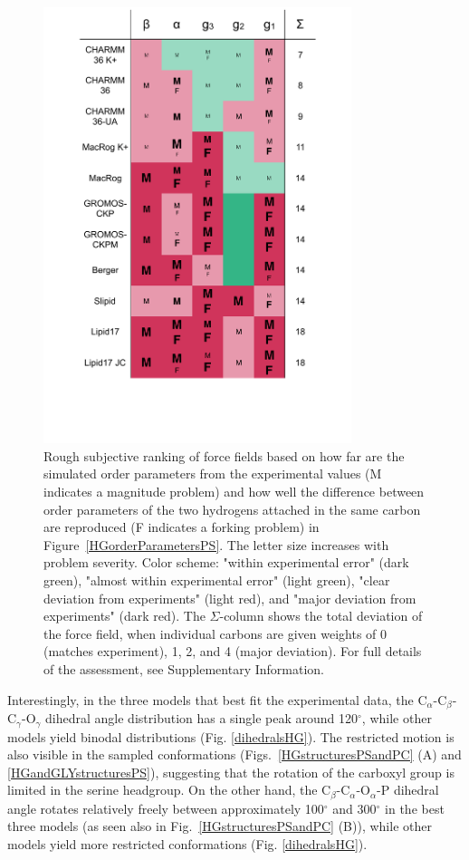 \documentclass[journal=jpcbfk,manuscript=article]{achemso}
\begin{document}
\begin{figure}[]
  \centering
  \includegraphics[width=9.0cm]{../Figs/comparisonTablePS.pdf}
  \caption{\label{comparisonTablePS}
    Rough subjective ranking of force fields based on how far are the simulated order parameters from the experimental
    values ({\textsf{\small M}} indicates a magnitude problem) and how well the difference between order parameters
    of the two hydrogens attached in the same carbon are reproduced ({\textsf{\small F}} indicates a forking problem)
    in Figure~\ref{HGorderParametersPS}.
    The letter size increases with problem severity. Color scheme: "within experimental error" (dark green), "almost within experimental error" (light green), "clear deviation from experiments" (light red), and "major deviation from experiments" (dark red). The $\Sigma$-column shows the total deviation of the force field, when individual carbons are given weights of 0 (matches experiment), 1, 2, and 4 (major deviation). For full details of the assessment, see Supplementary Information.
  }
\end{figure}


Interestingly, in the three models that best fit the experimental data,
the C$_\alpha$-C$_\beta$-C$_\gamma$-O$_\gamma$ dihedral angle distribution has a single peak around 120$^{\circ}$, while
other models yield binodal distributions (Fig. \ref{dihedralsHG}).
The restricted motion is also visible in the sampled conformations (Figs.~\ref{HGstructuresPSandPC} (A) and \ref{HGandGLYstructuresPS}),
suggesting that the rotation of the carboxyl group is limited in the serine headgroup.
On the other hand, the C$_\beta$-C$_\alpha$-O$_\alpha$-P dihedral angle rotates relatively
freely between approximately 100$^{\circ}$ and 300$^{\circ}$ in the best three models (as seen also in Fig.~\ref{HGstructuresPSandPC} (B)),
while other models yield more restricted conformations (Fig. \ref{dihedralsHG}).
\end{document}
